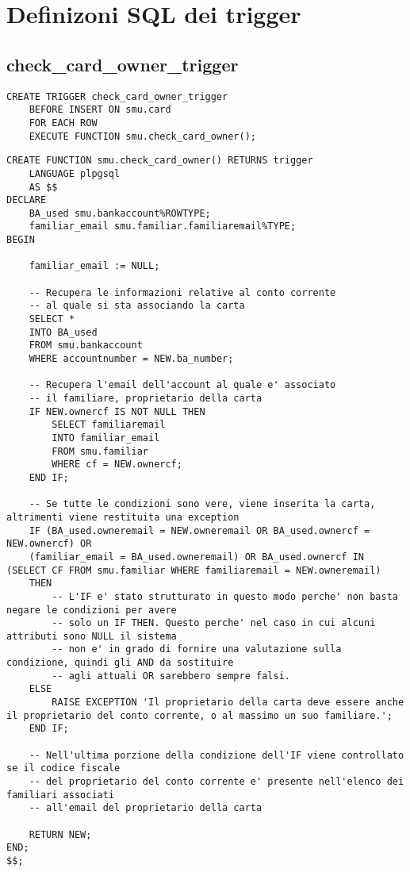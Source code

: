 \section{Definizoni SQL dei trigger}

\subsection{check\_card\_owner\_trigger}

\begin{lstlisting}
CREATE TRIGGER check_card_owner_trigger
    BEFORE INSERT ON smu.card
    FOR EACH ROW
    EXECUTE FUNCTION smu.check_card_owner();
\end{lstlisting}

\begin{lstlisting}
CREATE FUNCTION smu.check_card_owner() RETURNS trigger
    LANGUAGE plpgsql
    AS $$
DECLARE
    BA_used smu.bankaccount%ROWTYPE;
    familiar_email smu.familiar.familiaremail%TYPE;
BEGIN

    familiar_email := NULL;

    -- Recupera le informazioni relative al conto corrente
    -- al quale si sta associando la carta
    SELECT *
    INTO BA_used
    FROM smu.bankaccount
    WHERE accountnumber = NEW.ba_number;

    -- Recupera l'email dell'account al quale e' associato
    -- il familiare, proprietario della carta
    IF NEW.ownercf IS NOT NULL THEN
        SELECT familiaremail
        INTO familiar_email
        FROM smu.familiar
        WHERE cf = NEW.ownercf;
    END IF;

    -- Se tutte le condizioni sono vere, viene inserita la carta, altrimenti viene restituita una exception
    IF (BA_used.owneremail = NEW.owneremail OR BA_used.ownercf = NEW.ownercf) OR
    (familiar_email = BA_used.owneremail) OR BA_used.ownercf IN (SELECT CF FROM smu.familiar WHERE familiaremail = NEW.owneremail)
    THEN
        -- L'IF e' stato strutturato in questo modo perche' non basta negare le condizioni per avere
        -- solo un IF THEN. Questo perche' nel caso in cui alcuni attributi sono NULL il sistema
        -- non e' in grado di fornire una valutazione sulla condizione, quindi gli AND da sostituire
        -- agli attuali OR sarebbero sempre falsi.
    ELSE
        RAISE EXCEPTION 'Il proprietario della carta deve essere anche il proprietario del conto corrente, o al massimo un suo familiare.';
    END IF;

    -- Nell'ultima porzione della condizione dell'IF viene controllato se il codice fiscale
    -- del proprietario del conto corrente e' presente nell'elenco dei familiari associati
    -- all'email del proprietario della carta

    RETURN NEW;
END;
$$;
\end{lstlisting}

